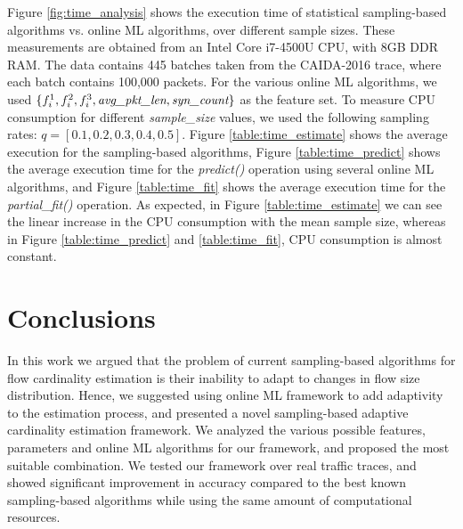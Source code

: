 		Figure \ref{fig:time_analysis} shows the execution time of statistical sampling-based algorithms vs. online ML algorithms, over different sample sizes. These measurements are obtained from an Intel Core i7-4500U CPU, with 8GB DDR RAM. The data contains 445 batches taken from the CAIDA-2016 trace, where each batch contains 100,000 packets. For the various online ML algorithms, we used $\{f_i^1, f_i^2, f_i^3, \emph{avg\_pkt\_len}, \emph{syn\_count}\}$ as the feature set. To measure CPU consumption for different \emph{sample\_size} values, we used the following sampling rates: $q = [0.1, 0.2, 0.3, 0.4, 0.5]$. Figure \ref{table:time_estimate} shows the average execution for the sampling-based algorithms,  Figure \ref{table:time_predict} shows the average execution time for the \emph{predict()} operation using several online ML algorithms, and Figure \ref{table:time_fit} shows the average execution time for the \emph{partial\_fit()} operation. As expected, in Figure \ref{table:time_estimate} we can see the linear increase in the CPU consumption with the mean sample size, whereas in Figure \ref{table:time_predict} and \ref{table:time_fit}, CPU consumption is almost constant.

\section{Conclusions} \label{sec:conclusions}
	
		In this work we argued that the problem of current sampling-based algorithms for flow cardinality estimation is their inability to adapt to changes in flow size distribution. Hence, we suggested using online ML framework to add adaptivity to the estimation process, and presented a novel sampling-based adaptive cardinality estimation framework. We analyzed the various possible features, parameters and online ML algorithms for our framework, and proposed the most suitable combination. We tested our framework over real traffic traces, and showed significant improvement in accuracy compared to the best known sampling-based algorithms while using the same amount of computational resources.
	
